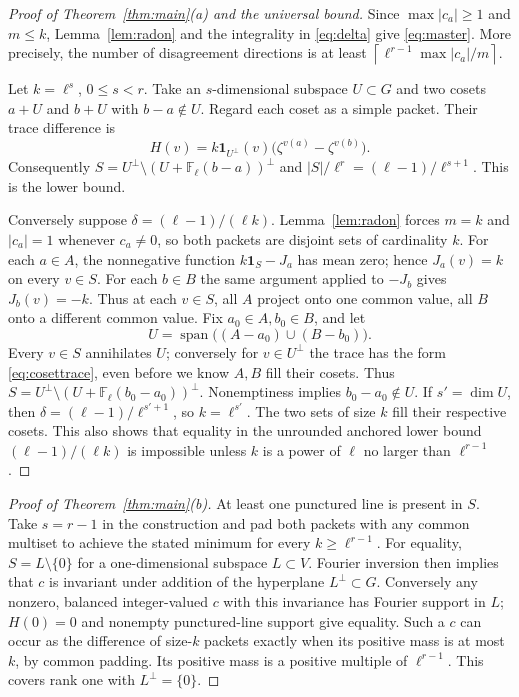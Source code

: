 \documentclass[11pt]{article}
\theoremstyle{remark}\newtheorem{remark}[theorem]{Remark}
\newcommand{\F}{\mathbb F}
\newcommand{\one}{\mathbf 1}
\newcommand{\ceil}[1]{\left\lceil #1\right\rceil}
\begin{document}
\begin{proof}[Proof of Theorem~\ref{thm:main}(a) and the universal bound]
Since $\max|c_a|\ge1$ and $m\le k$, Lemma~\ref{lem:radon} and the integrality in \eqref{eq:delta} give \eqref{eq:master}. More precisely, the number of disagreement directions is at least $\ceil{\ell^{r-1}\max|c_a|/m}$.

Let $k=\ell^s$, $0\le s<r$. Take an $s$-dimensional subspace $U\subset G$ and two cosets $a+U$ and $b+U$ with $b-a\notin U$. Regard each coset as a simple packet. Their trace difference is
\begin{equation}\label{eq:cosettrace}
 H(v)=k\one_{U^\perp}(v)\bigl(\zeta^{v(a)}-\zeta^{v(b)}\bigr).
\end{equation}
Consequently $S=U^\perp\setminus(U+\F_\ell(b-a))^\perp$ and $|S|/\ell^r=(\ell-1)/\ell^{s+1}$. This is the lower bound.

Conversely suppose $\delta=(\ell-1)/(\ell k)$. Lemma~\ref{lem:radon} forces $m=k$ and $|c_a|=1$ whenever $c_a\ne0$, so both packets are disjoint sets of cardinality $k$. For each $a\in A$, the nonnegative function $k\one_S-J_a$ has mean zero; hence $J_a(v)=k$ on every $v\in S$. For each $b\in B$ the same argument applied to $-J_b$ gives $J_b(v)=-k$. Thus at each $v\in S$, all $A$ project onto one common value, all $B$ onto a different common value. Fix $a_0\in A,b_0\in B$, and let
\[
 U=\operatorname{span}\bigl((A-a_0)\cup(B-b_0)\bigr).
\]
Every $v\in S$ annihilates $U$; conversely for $v\in U^\perp$ the trace has the form \eqref{eq:cosettrace}, even before we know $A,B$ fill their cosets. Thus $S=U^\perp\setminus(U+\F_\ell(b_0-a_0))^\perp$. Nonemptiness implies $b_0-a_0\notin U$. If $s'=\dim U$, then $\delta=(\ell-1)/\ell^{s'+1}$, so $k=\ell^{s'}$. The two sets of size $k$ fill their respective cosets. This also shows that equality in the unrounded anchored lower bound $(\ell-1)/(\ell k)$ is impossible unless $k$ is a power of $\ell$ no larger than $\ell^{r-1}$.
\end{proof}

\begin{proof}[Proof of Theorem~\ref{thm:main}(b)]
At least one punctured line is present in $S$. Take $s=r-1$ in the construction and pad both packets with any common multiset to achieve the stated minimum for every $k\ge\ell^{r-1}$. For equality, $S=L\setminus\{0\}$ for a one-dimensional subspace $L\subset V$. Fourier inversion then implies that $c$ is invariant under addition of the hyperplane $L^\perp\subset G$. Conversely any nonzero, balanced integer-valued $c$ with this invariance has Fourier support in $L$; $H(0)=0$ and nonempty punctured-line support give equality. Such a $c$ can occur as the difference of size-$k$ packets exactly when its positive mass is at most $k$, by common padding. Its positive mass is a positive multiple of $\ell^{r-1}$. This covers rank one with $L^\perp=\{0\}$.
\end{proof}
\end{document}
